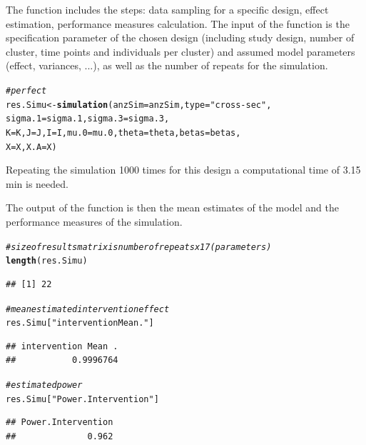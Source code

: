 \documentclass{article}\usepackage[]{graphicx}\usepackage[]{color}
\makeatletter
\newcommand{\hlstr}[1]{\textcolor[rgb]{0.192,0.494,0.8}{#1}}%
\newcommand{\hlcom}[1]{\textcolor[rgb]{0.678,0.584,0.686}{\textit{#1}}}%
\newcommand{\hlstd}[1]{\textcolor[rgb]{0.345,0.345,0.345}{#1}}%
\newcommand{\hlkwb}[1]{\textcolor[rgb]{0.69,0.353,0.396}{#1}}%
\newcommand{\hlkwc}[1]{\textcolor[rgb]{0.333,0.667,0.333}{#1}}%
\newcommand{\hlkwd}[1]{\textcolor[rgb]{0.737,0.353,0.396}{\textbf{#1}}}%
\newenvironment{kframe}{%
 \def\at@end@of@kframe{}%
 \ifinner\ifhmode%
  \def\at@end@of@kframe{\end{minipage}}%
  \begin{minipage}{\columnwidth}%
 \fi\fi%
 \def\FrameCommand##1{\hskip\@totalleftmargin \hskip-\fboxsep
 \colorbox{shadecolor}{##1}\hskip-\fboxsep
     \hskip-\linewidth \hskip-\@totalleftmargin \hskip\columnwidth}%
 \MakeFramed {\advance\hsize-\width
   \@totalleftmargin\z@ \linewidth\hsize
   \@setminipage}}%
 {\par\unskip\endMakeFramed%
 \at@end@of@kframe}
\newenvironment{knitrout}{}{} %
\makeatother
\begin{document}
The function includes the steps: data sampling for a specific design, effect estimation, performance measures calculation. The input of the function is the specification parameter of the chosen design (including study design, number of cluster, time points and individuals per cluster) and assumed model parameters (effect, variances, ...), as well as the number of repeats for the simulation.





\begin{knitrout}
\color{fgcolor}\begin{kframe}
\begin{alltt}
\hlcom{#perfect}
\hlstd{res.Simu}\hlkwb{<-}\hlkwd{simulation}\hlstd{(}\hlkwc{anzSim}\hlstd{=anzSim,}\hlkwc{type}\hlstd{=}\hlstr{"cross-sec"}\hlstd{,}
                   \hlkwc{sigma.1}\hlstd{=sigma.1,}\hlkwc{sigma.3}\hlstd{=sigma.3,}
                   \hlkwc{K}\hlstd{=K,}\hlkwc{J}\hlstd{=J,}\hlkwc{I}\hlstd{=I,}\hlkwc{mu.0}\hlstd{=mu.0,} \hlkwc{theta}\hlstd{=theta,}\hlkwc{betas}\hlstd{=betas,}
                   \hlkwc{X}\hlstd{=X,} \hlkwc{X.A}\hlstd{=X)}
\end{alltt}
\end{kframe}
\end{knitrout}





Repeating the simulation 1000 times for this design a computational time of 3.15  min is needed.

The output of the function is then the mean estimates of the model and the performance measures of the simulation. 


\begin{knitrout}
\color{fgcolor}\begin{kframe}
\begin{alltt}
\hlcom{#size of results matrix is number of repeats x 17 (parameters)}
\hlkwd{length}\hlstd{(res.Simu)}
\end{alltt}
\begin{verbatim}
## [1] 22
\end{verbatim}
\begin{alltt}
\hlcom{#mean estimated intervention effect}
\hlstd{res.Simu[}\hlstr{"intervention Mean ."}\hlstd{]}
\end{alltt}
\begin{verbatim}
## intervention Mean . 
##           0.9996764
\end{verbatim}
\begin{alltt}
\hlcom{#estimated power}
\hlstd{res.Simu[}\hlstr{"Power.Intervention"}\hlstd{]}
\end{alltt}
\begin{verbatim}
## Power.Intervention 
##              0.962
\end{verbatim}
\end{kframe}
\end{knitrout}
\end{document}
